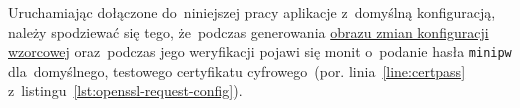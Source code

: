 \documentclass[thesis]{subfiles}
\begin{document}
Uruchamiając dołączone do~niniejszej pracy aplikacje z~domyślną konfiguracją, należy spodziewać się tego, że~podczas generowania \hyperref[sec:obraz-zmian-konfiguracji]{obrazu zmian konfiguracji wzorcowej} oraz~podczas jego weryfikacji pojawi się monit o~podanie hasła \texttt{minipw} dla~domyślnego, testowego certyfikatu cyfrowego~(por. linia~\ref{line:certpass} z~listingu~\ref{lst:openssl-request-config}).
\end{document}
